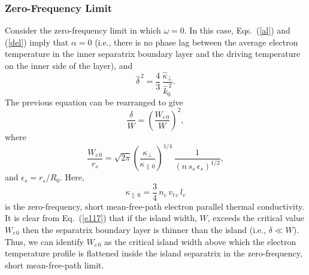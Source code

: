 \documentclass[12pt,prb,aps]{revtex4-1}
\begin{document}
\subsubsection{Zero-Frequency Limit}
Consider the zero-frequency limit in which $\omega=0$. In this case, Eqs.~(\ref{al}) and (\ref{del}) imply that $\alpha=0$ (i.e., there is no phase lag between the average
electron temperature in the inner separatrix boundary layer and the driving temperature on the inner side of the layer), and
\begin{equation}
\hat{\delta}^{\,2} = \frac{4}{3}\,\frac{\hat{\kappa}_\perp}{\hat{k}_0^{\,2}}.
\end{equation}
The previous equation can be rearranged to give
\begin{equation}\label{e117}
\frac{\delta}{W} = \left(\frac{W_{c\,0}}{W}\right)^2,
\end{equation}
where\,\cite{rf}
\begin{equation}
\frac{W_{c\,0}}{r_s} =
\sqrt{2\pi}\left(\frac{\kappa_\perp}{\kappa_{\parallel\,0}}\right)^{1/4}\,\frac{1}{(n\,s_s\,\epsilon_s)^{1/2}},
\end{equation}
and $\epsilon_s=r_s/R_0$. Here, 
\begin{equation}
\kappa_{\parallel\,0} = \frac{3}{4}\,n_e\,v_{t\,e}\,l_e
\end{equation}
is the zero-frequency, short mean-free-path electron parallel thermal conductivity.\cite{fitz,brag} It is clear from Eq.~(\ref{e117}) that if the island width, $W$,
exceeds the critical value $W_{c\,0}$ then the separatrix boundary layer is thinner than the island (i.e., $\delta\ll W$). Thus, we
can identify $W_{c\,0}$ as the critical island width above which the electron temperature profile is flattened inside the island separatrix
in the zero-frequency, short mean-free-path  limit.
\end{document}
